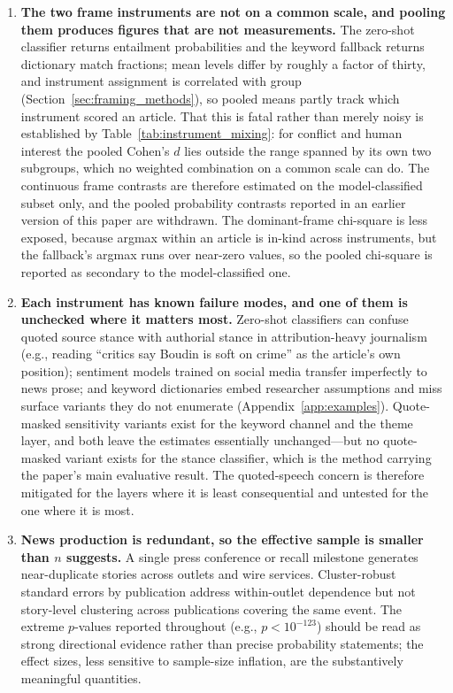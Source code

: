 \documentclass[12pt, letterpaper]{article}
\begin{document}
\begin{enumerate}[leftmargin=*, itemsep=6pt]
\item \textbf{The two frame instruments are not on a common scale, and pooling them produces figures that are not measurements.} The zero-shot classifier returns entailment probabilities and the keyword fallback returns dictionary match fractions; mean levels differ by roughly a factor of thirty, and instrument assignment is correlated with group (Section~\ref{sec:framing_methods}), so pooled means partly track which instrument scored an article. That this is fatal rather than merely noisy is established by Table~\ref{tab:instrument_mixing}: for conflict and human interest the pooled Cohen's $d$ lies outside the range spanned by its own two subgroups, which no weighted combination on a common scale can do. The continuous frame contrasts are therefore estimated on the model-classified subset only, and the pooled probability contrasts reported in an earlier version of this paper are withdrawn. The dominant-frame chi-square is less exposed, because argmax within an article is in-kind across instruments, but the fallback's argmax runs over near-zero values, so the pooled chi-square is reported as secondary to the model-classified one.

\item \textbf{Each instrument has known failure modes, and one of them is unchecked where it matters most.} Zero-shot classifiers can confuse quoted source stance with authorial stance in attribution-heavy journalism (e.g., reading ``critics say Boudin is soft on crime'' as the article's own position); sentiment models trained on social media transfer imperfectly to news prose; and keyword dictionaries embed researcher assumptions and miss surface variants they do not enumerate (Appendix~\ref{app:examples}). Quote-masked sensitivity variants exist for the keyword channel and the theme layer, and both leave the estimates essentially unchanged---but no quote-masked variant exists for the stance classifier, which is the method carrying the paper's main evaluative result. The quoted-speech concern is therefore mitigated for the layers where it is least consequential and untested for the one where it is most.

\item \textbf{News production is redundant, so the effective sample is smaller than $n$ suggests.} A single press conference or recall milestone generates near-duplicate stories across outlets and wire services. Cluster-robust standard errors by publication address within-outlet dependence but not story-level clustering across publications covering the same event. The extreme $p$-values reported throughout (e.g., $p < 10^{-123}$) should be read as strong directional evidence rather than precise probability statements; the effect sizes, less sensitive to sample-size inflation, are the substantively meaningful quantities.


\end{enumerate}
\end{document}
